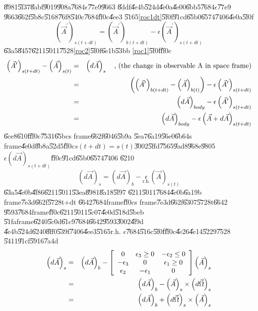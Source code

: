 \documentclass[12pt,a4paper]{article}
\begin{document}
\U{8981}\U{5f37}\U{8abf}\U{9019}\U{908a}\U{7684}$\epsilon $\U{77e9}\U{9663}%
\U{8ddf}\U{4e4b}\U{524d}\U{4e0a}\U{4e00}\U{6bb5}\U{7684}$\epsilon $\U{77e9}%
\U{9663}\U{662f}\U{5b8c}\U{5168}\U{76f8}\U{540c}\U{7684}\U{ff0c}\U{4ee3}%
\U{5165}\ref{roc1dt}\U{5f0f}\U{91cd}\U{65b0}\U{6574}\U{7406}\U{4e0a}\U{5f0f}%
\begin{equation}
\left( \vec{A}^{\prime }\right) _{s(t+dt)}=\left( \vec{A}^{\prime }\right)
_{b(t+dt)}-\epsilon \left( \vec{A}^{\prime }\right) _{s(t+dt)}  \label{roc2}
\end{equation}%
\U{63a5}\U{8457}\U{6211}\U{5011}\U{7528}\ref{roc2}\U{5f0f}\U{6e1b}\U{53bb}%
\ref{roc1}\U{5f0f}\U{ff0c}%
\begin{eqnarray}
\left( \vec{A}^{\prime }\right) _{s(t+dt)}-\left( \vec{A}\right) _{s(t)}
&=&\left( d\vec{A}\right) _{s}\text{ , (the change in observable A in space
frame)}  \notag \\
&=&\left( \left( \vec{A}^{\prime }\right) _{b(t+dt)}-\left( \vec{A}\right)
_{b(t)}\right) -\epsilon \left( \vec{A}^{\prime }\right) _{s(t+dt)}  \notag
\\
&=&\left( d\vec{A}\right) _{body}-\epsilon \left( \vec{A}^{\prime }\right)
_{s(t+dt)}  \notag \\
&=&\left( d\vec{A}\right) _{body}-\epsilon \left( \vec{A}+d\vec{A}\right)
_{s(t+dt)}  \label{roc4}
\end{eqnarray}%
\U{6ce8}\U{610f}\U{ff0c}\U{7531}\U{65bc}s frame\U{662f}\U{6046}\U{5b9a}%
\U{5ea7}\U{6a19}\U{56e0}\U{6b64}s frame\U{4e0d}\U{8b8a}\U{52d5}\U{ff0c}$%
s(t+dt)=s(t)$\U{3002}\U{5ffd}\U{7565}\U{9ad8}\U{968e}\U{9805}$\epsilon
\left( d\vec{A}\right) _{s(t+dt)}$\U{ff0c}\U{91cd}\U{65b0}\U{6574}\U{7406}%
\U{6210}%
\begin{equation*}
\left( d\vec{A}\right) _{s}=\left( d\vec{A}\right) _{b}-\underset{\text{r.h.}%
}{\epsilon }\left( \vec{A}\right) _{s(t)}
\end{equation*}%
\U{63a5}\U{4e0b}\U{4f86}\U{6211}\U{5011}\U{53ea}\U{8981}\U{8a18}\U{5f97}%
\U{6211}\U{5011}\U{7684}\U{4e0b}\U{6a19}b frame\U{7e3d}\U{662f}\U{5728}t+dt%
\U{6642}\U{7684}frame\U{ff0c}s frame\U{7e3d}\U{662f}\U{6307}\U{5728}t\U{6642}%
\U{9593}\U{7684}frame\U{ff0c}\U{6211}\U{5011}\U{5c07}\U{4e0d}\U{518d}\U{5beb}%
\U{51fa}frame\U{6240}\U{5c0d}\U{61c9}\U{7684}\U{6642}\U{9593}\U{3002}\U{4f9d}%
\U{4e4b}\U{524d}\U{6240}\U{8ff0}\U{539f}\U{7406}\U{4ee3}\U{5165}r.h. $%
\epsilon $\U{7684}\U{516c}\U{5f0f}\U{ff0c}\U{4e26}\U{4e14}\U{5229}\U{7528}%
\U{5411}\U{91cf}\U{5916}\U{7a4d}%
\begin{eqnarray}
\left( d\vec{A}\right) _{s} &=&\left( d\vec{A}\right) _{b}-\left[ 
\begin{array}{ccc}
0 & \epsilon _{3}\geq 0 & -\epsilon _{2}\leq 0 \\ 
-\epsilon _{3} & 0 & \epsilon _{1}\geq 0 \\ 
\epsilon _{2} & -\epsilon _{1} & 0%
\end{array}%
\right] \left( \vec{A}\right) _{s}  \notag \\
&=&\left( d\vec{A}\right) _{b}-\left( \vec{A}\right) _{s}\times \left( d\vec{%
\Omega}\right) _{s}  \label{roc3} \\
&=&\left( d\vec{A}\right) _{b}+\left( d\vec{\Omega}\right) _{s}\times \left( 
\vec{A}\right) _{s}  \notag
\end{eqnarray}%
\end{document}
